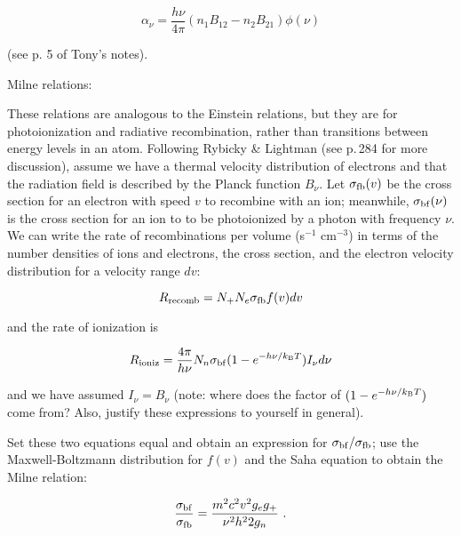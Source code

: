\begin{enumerate}
       \begin{equation}
      \alpha_\nu = \frac{h \nu}{4 \pi} (n_1 B_{12} - n_2 B_{21} ) \phi(\nu)
      \end{equation}
      
      (see p. 5 of Tony's notes). 
      
      Milne relations:
      
      These relations are analogous to the Einstein relations, but they are for photoionization and radiative recombination, rather than transitions between energy levels in an atom. Following Rybicky \& Lightman (see p.\,284 for more discussion), assume we have a thermal velocity distribution of electrons and that the radiation field is described by the Planck function $B_\nu$. Let $\sigma_{\rm fb}(v)$ be the cross section for an electron with speed $v$ to recombine with an ion; meanwhile, $\sigma_{\rm bf}(\nu)$ is the cross section for an ion to to be photoionized by a photon with frequency $\nu$. We can write the rate of recombinations per volume (s$^{-1}$ cm$^{-3}$) in terms of the number densities of ions and electrons, the cross section, and the electron velocity distribution for a velocity range $dv$:
      
      \begin{equation}
      R_{\rm recomb} = N_+N_e \sigma_{\rm fb} f(v) dv
      \end{equation}
      
      and the rate of ionization is
      
       \begin{equation}
      R_{\rm ioniz} = \frac{4\pi}{h\nu} N_n \sigma_{\rm bf} (1 - e^{-h\nu/k_{\rm B}T}) I_\nu d\nu
      \end{equation}
      
      and we have assumed $I_\nu = B_\nu$ (note: where does the factor of $(1 - e^{-h\nu/k_{\rm B}T})$ come from? Also, justify these expressions to yourself in general).
      
      Set these two equations equal and obtain an expression for $\sigma_{\rm bf} / \sigma_{\rm fb}$; use the Maxwell-Boltzmann distribution for $f(v)$ and the Saha equation to obtain the Milne relation:
      
      \begin{equation}
      \frac{\sigma_{\rm bf}}{\sigma_{\rm fb}} = \frac{m^2 c^2 v^2 g_e g_+}{\nu^2 h^2 2 g_n}\,\, .
      \end{equation}
      

\end{enumerate}
